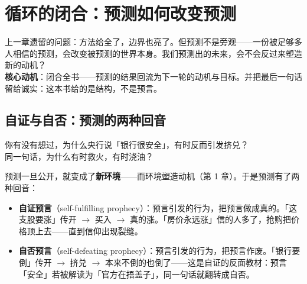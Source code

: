 \documentclass[../../main2.tex]{subfiles}
\begin{document}
\chapter{循环的闭合：预测如何改变预测}
\label{ch:closure}

\begin{motivation}
	上一章遗留的问题：方法给全了，边界也亮了。但预测不是旁观——一份被足够多人相信的预测，会改变被预测的世界本身。我们预测出的未来，会不会反过来塑造新的动机？\\
	\textbf{核心动机}：闭合全书——预测的结果回流为下一轮的动机与目标。并把最后一句话留给诚实：这本书给的是结构，不是预言。
\end{motivation}

\begin{logicmap}
\end{logicmap}

\section{自证与自否：预测的两种回音}

\begin{readingnote}
	你有没有想过，为什么央行说「银行很安全」，有时反而引发挤兑？\\
	同一句话，为什么有时救火，有时浇油？
\end{readingnote}

预测一旦公开，就变成了\textbf{新环境}——而环境塑造动机（第 1 章）。于是预测有了两种回音：

\begin{itemize}
	\item \textbf{自证预言}（self-fulfilling prophecy）：预言引发的行为，把预言做成真的。「这支股要涨」传开 $\rightarrow$ 买入 $\rightarrow$ 真的涨。「房价永远涨」信的人多了，抢购把价格顶上去——直到信仰出现裂缝。
	\item \textbf{自否预言}（self-defeating prophecy）：预言引发的行为，把预言作废。「银行要倒」传开 $\rightarrow$ 挤兑 $\rightarrow$ 本来不倒的也倒了——这是自证的反面教材：预言「安全」若被解读为「官方在捂盖子」，同一句话就翻转成自否。
\end{itemize}
\end{document}
